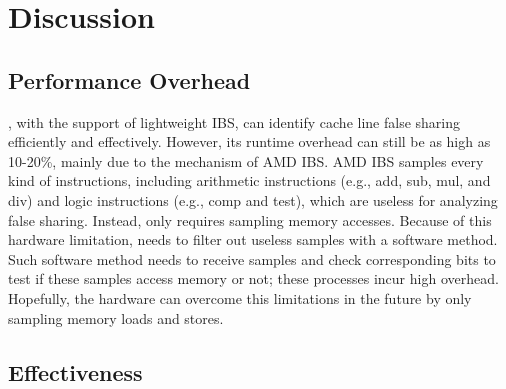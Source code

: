 \section{Discussion}

\label{sec:discuss}

\subsection{Performance Overhead}

\Cheetah{}, with the support of lightweight IBS, can identify cache line false sharing efficiently and effectively. However, its runtime overhead can still be as high as 10-20\%, mainly due to the mechanism of AMD IBS. AMD IBS samples every kind of instructions, including arithmetic instructions (e.g., add, sub, mul, and div) and logic instructions (e.g., comp and test), which are useless for analyzing false sharing. Instead, \cheetah{} only requires sampling memory accesses. Because of this hardware limitation, \cheetah{} needs to filter out useless samples with a software method. Such software method needs \cheetah{} to receive samples and check corresponding bits to test if these samples access memory or not; these processes incur high overhead. Hopefully, the hardware can overcome this limitations in the future by only sampling memory loads and stores.

\subsection{Effectiveness}
